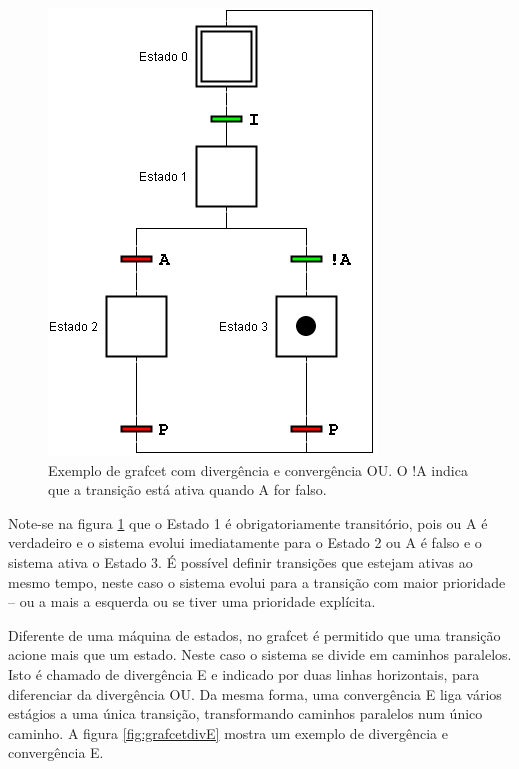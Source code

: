 \begin{figure}[hbt]
  \centering
  \includegraphics[scale=0.6]{figuras/grafcetdivOU}
  \caption{Exemplo de grafcet com divergência e convergência OU. O !A indica que a transição está ativa quando A for falso.}
  \label{fig:grafcetdivOU}
\end{figure}

Note-se na figura \ref{fig:grafcetdivOU} que o Estado 1 é obrigatoriamente transitório, pois ou A é verdadeiro e o sistema evolui imediatamente para o Estado 2 ou A é falso e o sistema ativa o Estado 3. É possível definir transições que estejam ativas ao mesmo tempo, neste caso o sistema evolui para a transição com maior prioridade -- ou a mais a esquerda ou se tiver uma prioridade explícita.

Diferente de uma máquina de estados, no grafcet é permitido que uma transição acione mais que um estado. Neste caso o sistema se divide em caminhos paralelos. Isto é chamado de divergência E e indicado por duas linhas horizontais, para diferenciar da divergência OU. Da mesma forma, uma convergência E liga vários estágios a uma única transição, transformando caminhos paralelos num único caminho. A figura \ref{fig:grafcetdivE} mostra um exemplo de divergência e convergência E.

